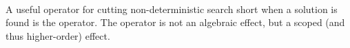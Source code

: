 \begin{code}[hide]%
%
\>[6]\AgdaSpace{}%
\AgdaSpace{}%
\AgdaSpace{}%
\AgdaSpace{}%
\AgdaSpace{}%
\AgdaSpace{}%
\AgdaSymbol{=}\AgdaSpace{}%
\AgdaSymbol{(}\AgdaSpace{}%
\AgdaSymbol{)}\AgdaSpace{}%
\AgdaSpace{}%
\AgdaSymbol{(}\AgdaSpace{}%
\AgdaSpace{}%
\AgdaSpace{}%
\AgdaSymbol{)}\<%
\\
\>[6][@{}l@{\AgdaIndent{0}}]%
\>[8]\AgdaSpace{}%
\AgdaSpace{}%
\AgdaSpace{}%
\AgdaSpace{}%
\AgdaSymbol{(}\AgdaSpace{}%
\AgdaSpace{}%
\AgdaSymbol{)}\<%
\\
%
\\[\AgdaEmptyExtraSkip]%
%
\>[6]\AgdaSpace{}%
\AgdaSpace{}%
\AgdaSpace{}%
\AgdaSpace{}%
\AgdaSymbol{=}\AgdaSpace{}%
\AgdaSymbol{(}\AgdaSpace{}%
\AgdaSymbol{)}\AgdaSpace{}%
\AgdaSpace{}%
\<%
\\
\>[6][@{}l@{\AgdaIndent{0}}]%
\>[8]\AgdaSpace{}%
\AgdaSpace{}%
\AgdaSpace{}%
\AgdaSpace{}%
\AgdaSymbol{(}\AgdaSpace{}%
\AgdaSpace{}%
\AgdaSymbol{)}\<%
\\
%
\\[\AgdaEmptyExtraSkip]%
%
\>[6]\AgdaSpace{}%
\AgdaModule{\AgdaUnderscore{}}\AgdaSpace{}%
\AgdaSpace{}%
\AgdaSpace{}%
\AgdaSymbol{:}\AgdaSpace{}%
\AgdaSpace{}%
\AgdaSpace{}%
\<%
\end{code}
A useful operator for cutting non-deterministic search short when a solution is found is the  operator.
The  operator is not an algebraic effect, but a scoped (and thus higher-order) effect.
